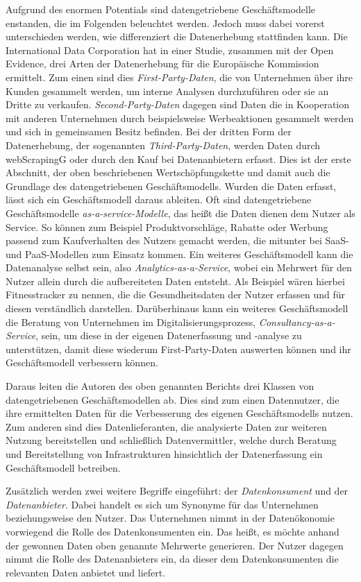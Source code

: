 \noindent Aufgrund des enormen Potentials sind datengetriebene Geschäftsmodelle enstanden, die im Folgenden beleuchtet werden. Jedoch muss dabei vorerst unterschieden werden, wie differenziert die Datenerhebung stattfinden kann. Die International Data Corporation hat in einer Studie, zusammen mit der Open Evidence, drei Arten der Datenerhebung für die Europäische Kommission ermittelt. Zum einen sind dies \textit{First-Party-Daten}, die von Unternehmen über ihre Kunden gesammelt werden, um interne Analysen durchzuführen oder sie an Dritte zu verkaufen. \textit{Second-Party-Daten} dagegen sind Daten die in Kooperation mit anderen Unternehmen durch beispielsweise Werbeaktionen gesammelt werden und sich in gemeinsamen Besitz befinden. Bei der dritten Form der Datenerhebung, der sogenannten \textit{Third-Party-Daten}, werden Daten durch \gls{webScrapingG} oder durch den Kauf bei Datenanbietern erfasst. Dies ist der erste Abschnitt, der oben beschriebenen Wertschöpfungskette und damit auch die Grundlage des datengetriebenen Geschäftsmodells. Wurden die Daten erfasst, lässt sich ein Geschäftsmodell daraus ableiten. Oft sind datengetriebene Geschäftsmodelle \textit{\glqq as-a-service\grqq{}-Modelle}, das heißt die Daten dienen dem Nutzer als Service. So können zum Beispiel Produktvorschläge, Rabatte oder Werbung passend zum Kaufverhalten des Nutzers gemacht werden, die mitunter bei \gls{SaaS}- und \gls{PaaS}-Modellen zum Einsatz kommen. Ein weiteres Geschäftsmodell kann die Datenanalyse selbst sein, also \textit{Analytics-as-a-Service}, wobei ein Mehrwert für den Nutzer allein durch die aufbereiteten Daten entsteht. Als Beispiel wären hierbei Fitnesstracker zu nennen, die die Gesundheitsdaten der Nutzer erfassen und für diesen verständlich darstellen. Darüberhinaus kann ein weiteres Geschäftsmodell die Beratung von Unternehmen im Digitalisierungsprozess, \textit{Consultancy-as-a-Service}, sein, um diese in der eigenen Datenerfassung und -analyse zu unterstützen, damit diese wiederum First-Party-Daten auswerten können und ihr Geschäftsmodell verbessern können. \newline

\noindent Daraus leiten die Autoren des oben genannten Berichts drei Klassen von datengetriebenen Geschäftsmodellen ab. Dies sind zum einen Datennutzer, die ihre ermittelten Daten für die Verbesserung des eigenen Geschäftsmodells nutzen. Zum anderen sind dies Datenlieferanten, die analysierte Daten zur weiteren Nutzung bereitstellen und schließlich Datenvermittler, welche durch Beratung und Bereitstellung von Infrastrukturen hinsichtlich der Datenerfassung ein Geschäftsmodell betreiben. \cite{smart_2013} \newline

\noindent Zusätzlich werden zwei weitere Begriffe eingeführt: der \textit{Datenkonsument} und der \textit{Datenanbieter}. Dabei handelt es sich um Synonyme für das Unternehmen beziehungsweise den Nutzer. Das Unternehmen nimmt in der Datenökonomie vorwiegend die Rolle des Datenkonsumenten ein. Das heißt, es möchte anhand der gewonnen Daten oben genannte Mehrwerte generieren. Der Nutzer dagegen nimmt die Rolle des Datenanbieters ein, da dieser dem Datenkonsumenten die relevanten Daten anbietet und liefert. 